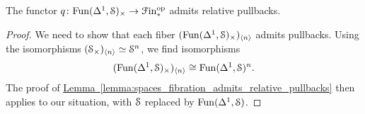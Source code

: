 \documentclass[main.tex]{subfiles}
\begin{document}
\begin{lemma}
  The functor $q\colon \Fun(\Delta^{1}, \S)_{\times} \to \Finp\op$ admits relative pullbacks.
\end{lemma}
\begin{proof}
  We need to show that each fiber $(\Fun(\Delta^{1}, \S)_{\times})_{\langle n \rangle}$ admits pullbacks. Using the isomorphisms $(\S_{\times})_{\langle n \rangle} \simeq \S^{n}$, we find isomorphisms
  \begin{equation*}
    (\Fun(\Delta^{1}, \S)_{\times})_{\langle n \rangle} \cong \Fun(\Delta^{1}, \S)^{n}.
  \end{equation*}
  The proof of \hyperref[lemma:spaces_fibration_admits_relative_pullbacks]{Lemma~\ref*{lemma:spaces_fibration_admits_relative_pullbacks}} then applies to our situation, with $\S$ replaced by $\Fun(\Delta^{1}, \S)$.
\end{proof}
\end{document}
